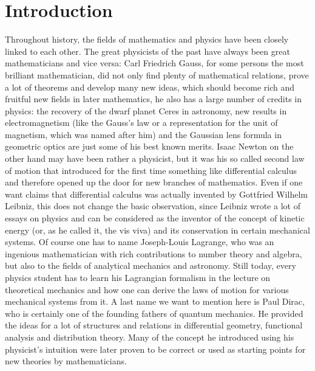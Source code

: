 
%
%

\chapter{Introduction}
\label{sec:Intro}

Throughout history, the fields of mathematics and physics have been 
closely linked to each other. The great physicists of the past have always been 
great mathematicians and vice versa: Carl Friedrich Gauss, for some persons the 
most brilliant mathematician, did not only find plenty of mathematical 
relations, prove a lot of theorems and develop many new ideas, which 
should become rich and fruitful new fields in later mathematics, he also has a 
large number of credits in physics: the recovery of the dwarf planet Ceres in 
astronomy, new results in electromagnetism (like the Gauss's law or a 
representation for the unit of magnetism, which was named after him) and the 
Gaussian lens formula in geometric optics are just some of his best known 
merits. Isaac Newton on the other hand may have been rather a physicist, but 
it was his so called second law of motion that introduced for the first time 
something like differential calculus and therefore opened up the door for new 
branches of mathematics. Even if one want claims that differential calculus 
was actually invented by Gottfried Wilhelm Leibniz, this does not change 
the basic observation, since Leibniz wrote a lot of essays on physics and can 
be considered as the inventor of the concept of kinetic energy (or, as he 
called it, the vis viva) and its conservation in certain mechanical 
systems. Of course one has to name Joseph-Louis Lagrange, who was an ingenious 
mathematician with rich contributions to number theory and algebra, but also to 
the fields of analytical mechanics and astronomy. Still today, every physics 
student has to learn his Lagrangian formalism in the lecture on theoretical 
mechanics and how one can derive the laws of motion for various mechanical 
systems from it. A last name we want to mention here is Paul 
Dirac, who is certainly one of the founding fathers of quantum mechanics. He 
provided the ideas for a lot of structures and relations in differential 
geometry, functional analysis and distribution theory. Many of the concept he 
introduced using his physicist's intuition were later proven to be correct or 
used as starting points for new theories by mathematicians.


